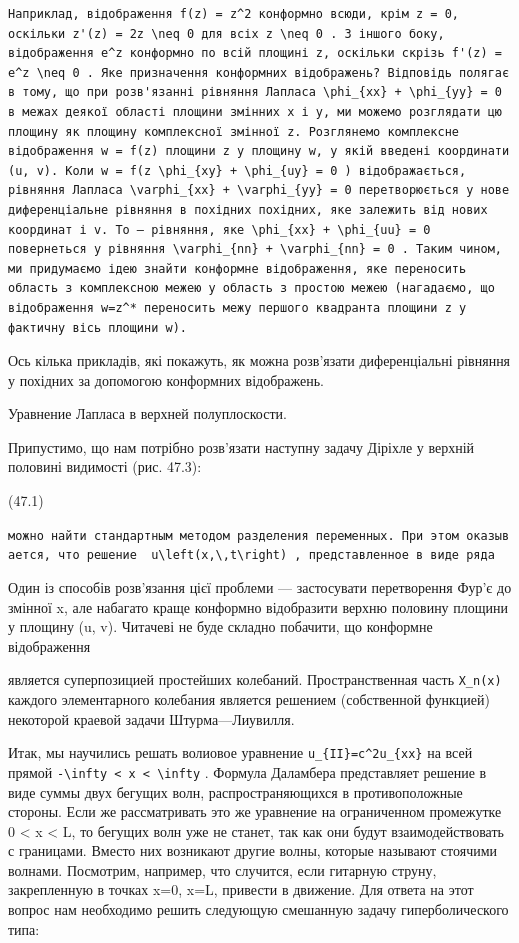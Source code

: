 \documentclass[
  ukrainian,
]{article}
\begin{document}
\begin{verbatim}
Наприклад, відображення f(z) = z^2 конформно всюди, крім z = 0, оскільки z'(z) = 2z \neq 0 для всіх z \neq 0 . З іншого боку, відображення e^z конформно по всій площині z, оскільки скрізь f'(z) = e^z \neq 0 . Яке призначення конформних відображень? Відповідь полягає в тому, що при розв'язанні рівняння Лапласа \phi_{xx} + \phi_{yy} = 0 в межах деякої області площини змінних x і y, ми можемо розглядати цю площину як площину комплексної змінної z. Розглянемо комплексне відображення w = f(z) площини z у площину w, у якій введені координати (u, v). Коли w = f(z \phi_{xy} + \phi_{uy} = 0 ) відображається, рівняння Лапласа \varphi_{xx} + \varphi_{yy} = 0 перетворюється у нове диференціальне рівняння в похідних похідних, яке залежить від нових координат і v. To — рівняння, яке \phi_{xx} + \phi_{uu} = 0 повернеться у рівняння \varphi_{nn} + \varphi_{nn} = 0 . Таким чином, ми придумаємо ідею знайти конформне відображення, яке переносить область з комплексною межею у область з простою межею (нагадаємо, що відображення w=z^* переносить межу першого квадранта площини z у фактичну вісь площини w).
\end{verbatim}

Ось кілька прикладів, які покажуть, як можна розв'язати диференціальні
рівняння у похідних за допомогою конформних відображень.

Уравнение Лапласа в верхней полуплоскости.

Припустимо, що нам потрібно розв'язати наступну задачу Діріхле у верхній
половині видимості (рис. 47.3):

(47.1)

\texttt{можно\ найти\ стандартным\ методом\ разделения\ переменных.\ При\ этом\ оказывается,\ что\ решение\ \ \textquotesingle{}u\textbackslash{}left(x,\textbackslash{},t\textbackslash{}right)\textquotesingle{}\ ,\ представленное\ в\ виде\ ряда}

Один із способів розв'язання цієї проблеми --- застосувати перетворення
Фур'є до змінної x, але набагато краще конформно відобразити верхню
половину площини у площину (u, v). Читачеві не буде складно побачити, що
конформне відображення

является суперпозицией простейших колебаний. Пространственная часть
\texttt{X\_n(x)} каждого элементарного колебания является решением
(собственной функцией) некоторой краевой задачи Штурма---Лиувилля.

Итак, мы научились решать волиовое уравнение
\texttt{u\_\{II\}=c\^{}2u\_\{xx\}} на всей прямой
\texttt{-\textbackslash{}infty\ \textless{}\ x\ \textless{}\ \textbackslash{}infty}
. Формула Даламбера представляет решение в виде суммы двух бегущих волн,
распространяющихся в противоположные стороны. Если же рассматривать это
же уравнение на ограниченном промежутке 0 \textless{} x \textless{} L,
то бегущих волн уже не станет, так как они будут взаимодействовать с
границами. Вместо них возникают другие волны, которые называют стоячими
волнами. Посмотрим, например, что случится, если гитарную струну,
закрепленную в точках x=0, x=L, привести в движение. Для ответа на этот
вопрос нам необходимо решить следующую смешанную задачу гиперболического
типа:
\end{document}
